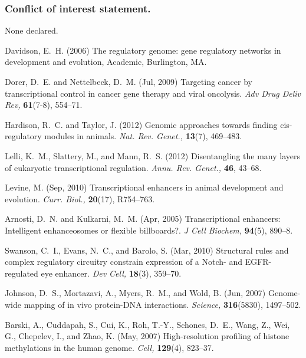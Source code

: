 \documentclass[a4,center,fleqn]{NAR}
\begin{document}
\subsubsection{Conflict of interest statement.} None declared.
\newpage

%  
%  
  
\begin{thebibliography}{10}

Davidson, E.~H. (2006)
The regulatory genome: gene regulatory networks in development and evolution,
Academic, Burlington, MA.

Dorer, D.~E. and Nettelbeck, D.~M. (Jul, 2009)
Targeting cancer by transcriptional control in cancer gene therapy and viral
  oncolysis.
{\em Adv Drug Deliv Rev,} {\bf 61}(7-8), 554--71.

Hardison, R.~C. and Taylor, J. (2012)
{{G}enomic approaches towards finding cis-regulatory modules in animals}.
{\em Nat. Rev. Genet.,} {\bf 13}(7), 469--483.

Lelli, K.~M., Slattery, M., and Mann, R.~S. (2012)
{{D}isentangling the many layers of eukaryotic transcriptional regulation}.
{\em Annu. Rev. Genet.,} {\bf 46}, 43--68.

Levine, M. (Sep, 2010)
{{T}ranscriptional enhancers in animal development and evolution}.
{\em Curr. Biol.,} {\bf 20}(17), R754--763.

Arnosti, D.~N. and Kulkarni, M.~M. (Apr, 2005)
Transcriptional enhancers: Intelligent enhanceosomes or flexible billboards?.
{\em J Cell Biochem,} {\bf 94}(5), 890--8.

Swanson, C.~I., Evans, N.~C., and Barolo, S. (Mar, 2010)
Structural rules and complex regulatory circuitry constrain expression of a
  Notch- and EGFR-regulated eye enhancer.
{\em Dev Cell,} {\bf 18}(3), 359--70.

Johnson, D.~S., Mortazavi, A., Myers, R.~M., and Wold, B. (Jun, 2007)
Genome-wide mapping of in vivo protein-DNA interactions.
{\em Science,} {\bf 316}(5830), 1497--502.

Barski, A., Cuddapah, S., Cui, K., Roh, T.-Y., Schones, D.~E., Wang, Z., Wei,
  G., Chepelev, I., and Zhao, K. (May, 2007)
High-resolution profiling of histone methylations in the human genome.
{\em Cell,} {\bf 129}(4), 823--37.


\end{thebibliography}
\end{document}
